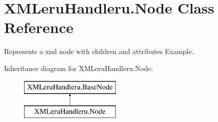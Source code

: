 \hypertarget{class_x_m_leru_handleru_1_1_node}{}\section{X\+M\+Leru\+Handleru.\+Node Class Reference}
\label{class_x_m_leru_handleru_1_1_node}


Represents a xml node with children and attributes Example.  


Inheritance diagram for X\+M\+Leru\+Handleru.\+Node\+:\begin{figure}[H]
\begin{center}
\leavevmode
\includegraphics[height=2.000000cm]{class_x_m_leru_handleru_1_1_node}
\end{center}
\end{figure}
